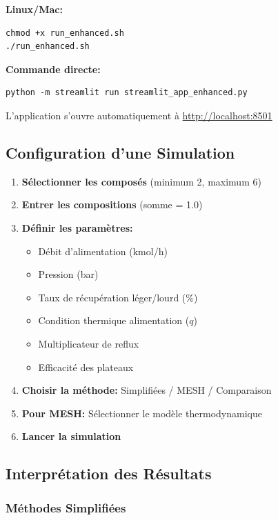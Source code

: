 \documentclass[11pt,a4paper]{article}
\begin{document}
\textbf{Linux/Mac:}
\begin{verbatim}
chmod +x run_enhanced.sh
./run_enhanced.sh
\end{verbatim}

\textbf{Commande directe:}
\begin{verbatim}
python -m streamlit run streamlit_app_enhanced.py
\end{verbatim}

L'application s'ouvre automatiquement à \url{http://localhost:8501}

\subsection{Configuration d'une Simulation}

\begin{enumerate}[leftmargin=*]
    \item \textbf{Sélectionner les composés} (minimum 2, maximum 6)
    \item \textbf{Entrer les compositions} (somme = 1.0)
    \item \textbf{Définir les paramètres:}
    \begin{itemize}
        \item Débit d'alimentation (kmol/h)
        \item Pression (bar)
        \item Taux de récupération léger/lourd (\%)
        \item Condition thermique alimentation ($q$)
        \item Multiplicateur de reflux
        \item Efficacité des plateaux
    \end{itemize}
    \item \textbf{Choisir la méthode:} Simplifiées / MESH / Comparaison
    \item \textbf{Pour MESH:} Sélectionner le modèle thermodynamique
    \item \textbf{Lancer la simulation}
\end{enumerate}

\subsection{Interprétation des Résultats}

\subsubsection{Méthodes Simplifiées}
\end{document}
